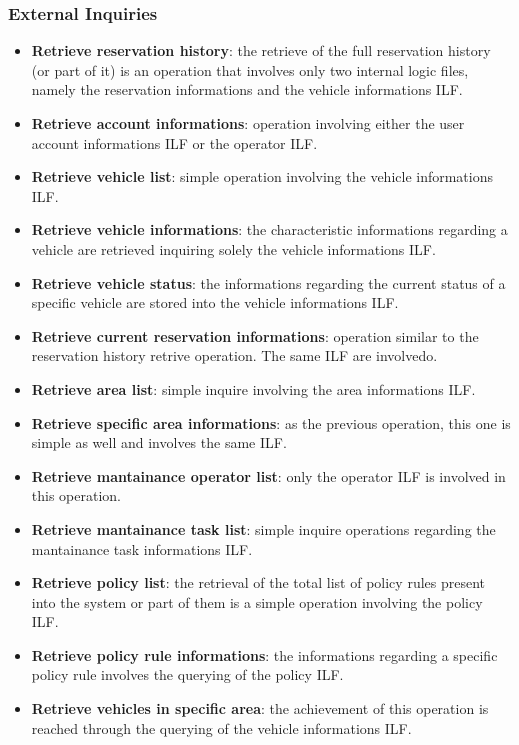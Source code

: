 \subsubsection{External Inquiries}

\begin{itemize}
	\item \textbf{Retrieve reservation history}: the retrieve of the full reservation history (or part of it) is an operation that involves only two internal logic files, namely the reservation informations and the vehicle informations ILF.

	\item \textbf{Retrieve account informations}: operation involving either the user account informations ILF or the operator ILF.

	\item \textbf{Retrieve vehicle list}: simple operation involving the vehicle informations ILF.

	\item \textbf{Retrieve vehicle informations}: the characteristic informations regarding a vehicle are retrieved inquiring solely the vehicle informations ILF.

	\item \textbf{Retrieve vehicle status}: the informations regarding the current status of a specific vehicle are stored into the vehicle informations ILF.

	\item \textbf{Retrieve current reservation informations}: operation similar to the reservation history retrive operation. The same ILF are involvedo.

	\item \textbf{Retrieve area list}: simple inquire involving the area informations ILF.

	\item \textbf{Retrieve specific area informations}: as the previous operation, this one is simple as well and involves the same ILF.

	\item \textbf{Retrieve mantainance operator list}: only the operator ILF is involved in this operation.

	\item \textbf{Retrieve mantainance task list}: simple inquire operations regarding the mantainance task informations ILF.

	\item \textbf{Retrieve policy list}: the retrieval of the total list of policy rules present into the system or part of them is a simple operation involving the policy ILF.

	\item \textbf{Retrieve policy rule informations}: the informations regarding a specific policy rule involves the querying of the policy ILF.

	\item \textbf{Retrieve vehicles in specific area}: the achievement of this operation is reached through the querying of the vehicle informations ILF. 
\end{itemize}


